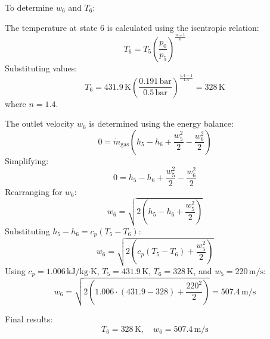 To determine \( w_6 \) and \( T_6 \):  

The temperature at state 6 is calculated using the isentropic relation:  
\[
T_6 = T_5 \left( \frac{p_0}{p_5} \right)^{\frac{n-1}{n}}
\]  
Substituting values:  
\[
T_6 = 431.9 \, \text{K} \left( \frac{0.191 \, \text{bar}}{0.5 \, \text{bar}} \right)^{\frac{1.4-1}{1.4}} = 328 \, \text{K}
\]  
where \( n = 1.4 \).  

The outlet velocity \( w_6 \) is determined using the energy balance:  
\[
0 = \dot{m}_{\text{gas}} \left( h_5 - h_6 + \frac{w_5^2}{2} - \frac{w_6^2}{2} \right)
\]  
Simplifying:  
\[
0 = h_5 - h_6 + \frac{w_5^2}{2} - \frac{w_6^2}{2}
\]  
Rearranging for \( w_6 \):  
\[
w_6 = \sqrt{2 \left( h_5 - h_6 + \frac{w_5^2}{2} \right)}
\]  
Substituting \( h_5 - h_6 = c_p (T_5 - T_6) \):  
\[
w_6 = \sqrt{2 \left( c_p (T_5 - T_6) + \frac{w_5^2}{2} \right)}
\]  
Using \( c_p = 1.006 \, \text{kJ/kg·K} \), \( T_5 = 431.9 \, \text{K} \), \( T_6 = 328 \, \text{K} \), and \( w_5 = 220 \, \text{m/s} \):  
\[
w_6 = \sqrt{2 \left( 1.006 \cdot (431.9 - 328) + \frac{220^2}{2} \right)} = 507.4 \, \text{m/s}
\]  

Final results:  
\[
T_6 = 328 \, \text{K}, \quad w_6 = 507.4 \, \text{m/s}
\]